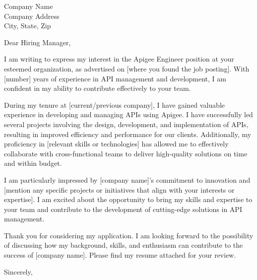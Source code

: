 \documentclass{letter}
\begin{document}
\begin{letter}{Company Name \\ Company Address \\ City, State, Zip}

\opening{Dear Hiring Manager,}

I am writing to express my interest in the Apigee Engineer position at your esteemed organization, as advertised on [where you found the job posting]. With [number] years of experience in API management and development, I am confident in my ability to contribute effectively to your team.

During my tenure at [current/previous company], I have gained valuable experience in developing and managing APIs using Apigee. I have successfully led several projects involving the design, development, and implementation of APIs, resulting in improved efficiency and performance for our clients. Additionally, my proficiency in [relevant skills or technologies] has allowed me to effectively collaborate with cross-functional teams to deliver high-quality solutions on time and within budget.

I am particularly impressed by [company name]'s commitment to innovation and [mention any specific projects or initiatives that align with your interests or expertise]. I am excited about the opportunity to bring my skills and expertise to your team and contribute to the development of cutting-edge solutions in API management.

Thank you for considering my application. I am looking forward to the possibility of discussing how my background, skills, and enthusiasm can contribute to the success of [company name]. Please find my resume attached for your review.

\closing{Sincerely,}

\end{letter}
\end{document}
